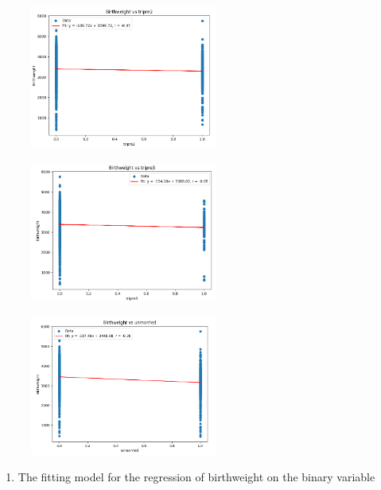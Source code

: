 \documentclass{uofa-eng-assignment}
\begin{document}
\begin{enumerate}
{\begin{figure}[H]
            \end{figure}
            \begin{figure}[H]
                \centering
                \includegraphics[width=0.55\textwidth]{bw-trip2.png}
            \end{figure}
            \begin{figure}[H]
                \centering
                \includegraphics[width=0.55\textwidth]{bw-trip3.png}
            \end{figure}
            \begin{figure}[H]
                \centering
                \includegraphics[width=0.55\textwidth]{bw-uma.png}
            \end{figure}
        }\clearpage
        \begin{enumerate}
            \item The fitting model for the regression of birthweight on the binary variable

\end{enumerate}
\end{enumerate}
\end{document}
